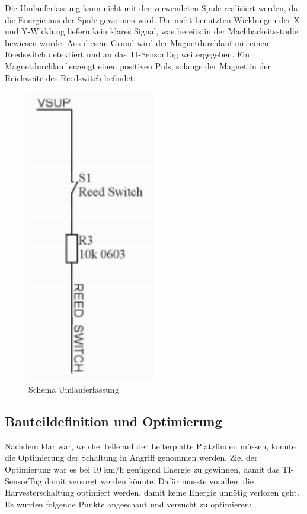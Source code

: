 Die Umlauferfassung kann nicht mit der verwendeten Spule realisiert werden, da die Energie aus der Spule gewonnen wird. Die nicht benutzten Wicklungen der X- und Y-Wicklung liefern kein klares Signal, was bereits in der Machbarkeitsstudie bewiesen wurde. Aus diesem Grund wird der Magnetdurchlauf mit einem Reedswitch detektiert und an das TI-SensorTag weitergegeben. Ein Magnetdurchlauf erzeugt einen positiven Puls, solange der Magnet in der Reichweite des Reedswitch befindet.

\begin{figure}[ht]
    \includegraphics[width=0.5\textwidth]{3Vorgehen/imag/Schema_Umlaufdetektion.png}
    \caption{Schema Umlauferfassung}\label{schema_umlaufdetektion} 
\end{figure}

\subsection{Bauteildefinition und Optimierung}

Nachdem klar war, welche Teile auf der Leiterplatte Platzfinden müssen, konnte die Optimierung der Schaltung in Angriff genommen werden. Ziel der Optimierung war es bei 10 km/h genügend Energie zu gewinnen, damit das TI-SensorTag damit versorgt werden könnte. Dafür musste vorallem die Harvesterschaltung optimiert werden, damit keine Energie unnötig verloren geht. 
Es wurden folgende Punkte angeschaut und versucht zu optimieren:

